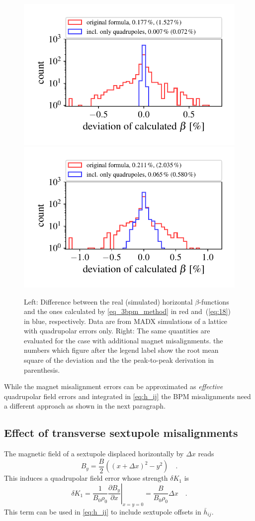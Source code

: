 \begin{figure}
	\centering
  \includegraphics[width=.49\linewidth]{hist1518_ONLYQUADS_01}
  \includegraphics[width=.49\linewidth]{hist1518_NAIV_01}
	\caption{
        Left: Difference between the real (simulated) horizontal $\beta$-functions and the ones
        calculated by \eqref{eq_3bpm_method} in red and~(\ref{eq:18}) in blue, respectively. Data are from MADX
        simulations of a lattice with quadrupolar errors only.
        Right: The same quantities are evaluated for the case with additional magnet misalignments.
        the numbers which figure after the legend label show the root mean square of the deviation
        and the the peak-to-peak derivation in parenthesis.
    }
	\label{fig:hist1518}
\end{figure}
%
While the magnet misalignment errors can be approximated as \emph{effective} quadrupolar field errors
and integrated in \eqref{eq:h_ij} the BPM misalignments need a different approach as shown in the
next paragraph.

\subsection{Effect of transverse sextupole misalignments}

The magnetic field of a sextupole displaced horizontally by $ \Delta x $ reads
%
\begin{equation}
B_y = \frac{B}{2}((x + \Delta x)^2 - y^2)\quad .
\end{equation}
%
{This induces a quadrupolar field error whose strength $ \delta K_1 $ is}
%
\begin{equation}
\delta K_1 =  \left.\frac{1}{B_0\rho_0}\frac{\partial B_y}{\partial x}\right|_{x=y=0}
  = \frac{B}{B_0\rho_0}\Delta x \quad .
\end{equation}
%
This {term} can be used in \eqref{eq:h_ij} to include sextupole offsets in $ \bar{h}_{ij} $.

